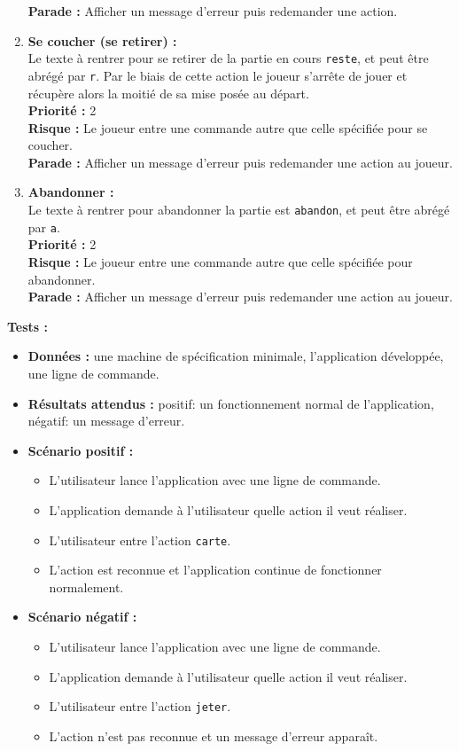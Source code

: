 \documentclass{article}
\newcommand{\code}[1]{\colorbox{light-gray}{\texttt{#1}}}
\begin{document}
\begin{enumerate}
    \textbf{Parade :} Afficher un message d'erreur puis redemander une action.\\
    \item \textbf {Se coucher (se retirer) :} \\
    Le texte à rentrer pour se retirer de la partie en cours \code{reste}, et peut être abrégé par \code{r}. Par le biais de cette action le joueur s'arrête de jouer et récupère alors la moitié de sa mise posée au départ. \\
    \textbf{Priorité :} 2 \\
    \textbf{Risque :} Le joueur entre une commande autre que celle spécifiée pour se coucher. \\
    \textbf{Parade :} Afficher un message d'erreur puis redemander une action au joueur.\\
    \item \textbf {Abandonner :} \\
    Le texte à rentrer pour abandonner la partie est \code{abandon}, et peut être abrégé par \code{a}. \\
    \textbf{Priorité :} 2 \\
    \textbf{Risque :} Le joueur entre une commande autre que celle spécifiée pour abandonner. \\
    \textbf{Parade :} Afficher un message d'erreur puis redemander une action au joueur.\\
\end{enumerate}
\textbf{Tests :}
\begin{itemize}
    \item \textbf{Données :} une machine de spécification minimale, l'application développée, une ligne de commande.
    \item \textbf{Résultats attendus :} positif: un fonctionnement normal de l'application, négatif: un message d'erreur.
    \item \textbf{Scénario positif :}
    \begin{itemize}
        \item L'utilisateur lance l'application avec une ligne de commande.
        \item L'application demande à l'utilisateur quelle action il veut réaliser.
        \item L'utilisateur entre l'action \code{carte}.
        \item L'action est reconnue et l'application continue de fonctionner normalement.
    \end{itemize}
    \item \textbf{Scénario négatif :}
    \begin{itemize}
        \item L'utilisateur lance l'application avec une ligne de commande.
        \item L'application demande à l'utilisateur quelle action il veut réaliser.
        \item L'utilisateur entre l'action \code{jeter}.
        \item L'action n'est pas reconnue et un message d'erreur apparaît.
    \end{itemize}
\end{itemize}
\end{document}

